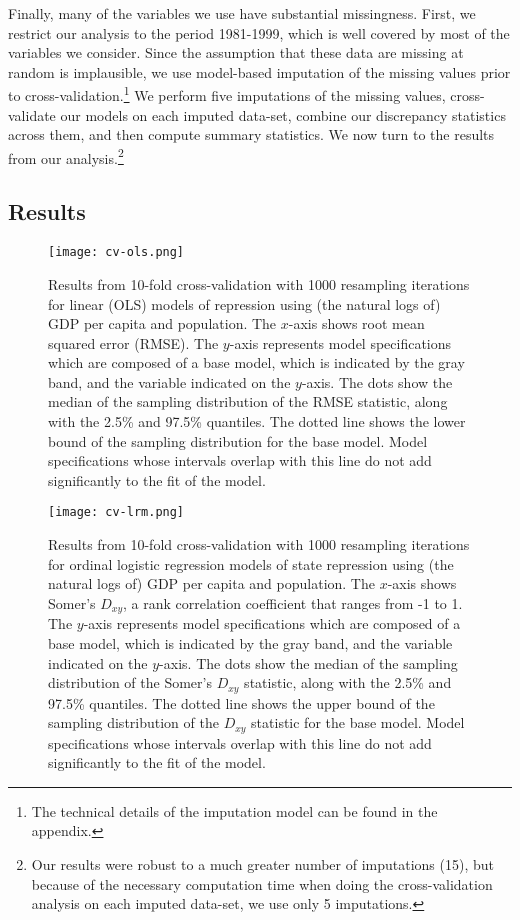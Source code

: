 \documentclass[11pt]{article}
\begin{document}
Finally, many of the variables we use have substantial missingness. First, we restrict our analysis to the period 1981-1999, which is well covered by most of the variables we consider. Since the assumption that these data are missing at random is implausible, we use model-based imputation of the missing values prior to cross-validation.\footnote{The technical details of the imputation model can be found in the appendix.} We perform five imputations of the missing values, cross-validate our models on each imputed data-set, combine our discrepancy statistics across them, and then compute summary statistics. We now turn to the results from our analysis.\footnote{Our results were robust to a much greater number of imputations (15), but because of the necessary computation time when doing the cross-validation analysis on each imputed data-set, we use only 5 imputations.}

\subsection{Results}

\begin{figure}[!htpb]
\centering
\texttt{[image: cv-ols.png]}
\caption{Results from 10-fold cross-validation with 1000 resampling iterations for linear (OLS) models of repression using (the natural logs of) GDP per capita and population. The $x$-axis shows root mean squared error (RMSE). The $y$-axis represents model specifications which are composed of a base model, which is indicated by the gray band, and the variable indicated on the $y$-axis. The dots show the median of the sampling distribution of the RMSE statistic, along with the 2.5\% and 97.5\% quantiles. The dotted line shows the lower bound of the sampling distribution for the base model. Model specifications whose intervals overlap with this line do not add significantly to the fit of the model.}
\label{fig:cv-ols}
\end{figure}

\begin{figure}[!htpb]
\centering
\texttt{[image: cv-lrm.png]}
\caption{Results from 10-fold cross-validation with 1000 resampling iterations for ordinal logistic regression models of state repression using (the natural logs of) GDP per capita and population. The $x$-axis shows Somer's $D_{xy}$, a rank correlation coefficient that ranges from -1 to 1. The $y$-axis represents model specifications which are composed of a base model, which is indicated by the gray band, and the variable indicated on the $y$-axis. The dots show the median of the sampling distribution of the Somer's $D_{xy}$ statistic, along with the 2.5\% and 97.5\% quantiles. The dotted line shows the upper bound of the sampling distribution of the $D_{xy}$ statistic for the base model. Model specifications whose intervals overlap with this line do not add significantly to the fit of the model.}
\label{fig:cv-lrm}
\end{figure}
\end{document}
